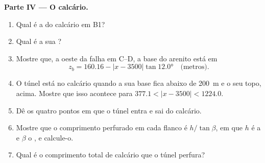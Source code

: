\begin{problem}
\medskip
\noindent\textbf{Parte IV --- O calcário.}
\begin{enumerate}[resume]
  \item Qual é a  do calcário em B1?
  \item Qual é a sua ?
  \item Mostre que, a oeste da falha em C--D, a base do arenito está
        em
        \[ z_b = 160.16 - |x - 3500|\tan\ang{12.0} \quad\text{(metros)}. \]
  \item O túnel está no calcário quando a sua base fica abaixo de \qty{200}{m} e o seu topo, acima. Mostre que isso acontece para $377.1 < |x - 3500|
        < 1224.0$.
  \item Dê os quatro pontos em que o túnel entra e sai do calcário.
  \item Mostre que o comprimento perfurado em cada flanco é $h/\tan\beta$, em que $h$ é a  e $\beta$ o , e calcule-o.
  \item Qual é o comprimento total de calcário que o túnel perfura?
\end{enumerate}
\end{problem}
